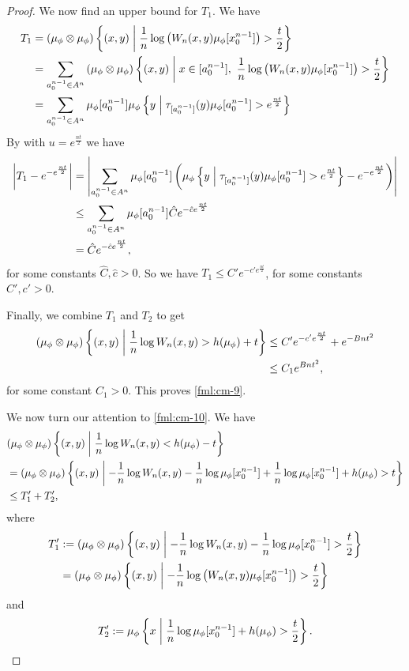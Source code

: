 \begin{theorem}
\begin{proof}
		We now find an upper bound for $T_1$. We have
		\begin{align*}
			T_1 &= (\mu_\phi \otimes \mu_\phi)\left\{(x, y) \midmid \frac{1}{n}\log\left(W_n(x, y) \mu_\phi[x_0^{n - 1}]\right) > \frac{t}{2}\right\} \\
				&= \sum_{a_0^{n - 1} \in A^n}{(\mu_\phi \otimes \mu_\phi)\left\{(x, y) \midmid x \in [a_0^{n - 1}],\ \frac{1}{n}\log\left(W_n(x, y) \mu_\phi[x_0^{n - 1}]\right) > \frac{t}{2}\right\}} \\
				&= \sum_{a_0^{n - 1} \in A^n}{\mu_\phi[a_0^{n - 1}] \mu_\phi\left\{y \midmid \tau_{[a_0^{n - 1}]}(y) \mu_\phi[a_0^{n - 1}] > e^\frac{nt}{2}\right\}}
		\end{align*}
		By  with $u = e^\frac{nt}{2}$ we have
		\begin{align*}
			\left|T_1 - e^{-e^\frac{nt}{2}}\right| &= \left|\sum_{a_0^{n - 1} \in A^n}\mu_\phi[a_0^{n - 1}]\left(\mu_\phi\left\{y \mathrel{}\middle|\mathrel{} \tau_{[a_0^{n - 1}]}(y) \mu_\phi[a_0^{n - 1}] > e^\frac{nt}{2}\right\} - e^{-e^\frac{nt}{2}}\right)\right| \\
				& \leq \sum_{a_0^{n - 1} \in A^n}\mu_\phi[a_0^{n - 1}] \hat{C}e^{-\hat{c}e^\frac{nt}{2}} \\
				& = \hat{C}e^{-\hat{c}e^\frac{nt}{2}},
		\end{align*}
		for some constants $\hat{C}, \hat{c} > 0$. So we have $T_1 \leq C'e^{-c'e^\frac{nt}{2}}$, for some constants $C', c' > 0$.
		
		Finally, we combine $T_1$ and $T_2$ to get
		\begin{align*}
			(\mu_\phi \otimes \mu_\phi)\left\{(x, y) \mathrel{}\middle|\mathrel{} \frac{1}{n}\log{W_n(x, y)} > h(\mu_\phi) + t\right\} &\leq C'e^{-c'e^\frac{nt}{2}} + e^{-Bnt^2} \\
				& \leq C_1 e^{Bnt^2},
		\end{align*}
		for some constant $C_1 > 0$. This proves \eqref{fml:cm-9}.
		
		We now turn our attention to \eqref{fml:cm-10}. We have
		\begin{align*}
			&(\mu_\phi \otimes \mu_\phi)\left\{(x, y) \mathrel{}\middle|\mathrel{} \frac{1}{n}\log{W_n(x, y)} < h(\mu_\phi) - t\right\} \\
				&= (\mu_\phi \otimes \mu_\phi)\left\{(x, y) \mathrel{}\middle|\mathrel{} -\frac{1}{n}\log{W_n(x, y)} - \frac{1}{n}\log{\mu_\phi[x_0^{n - 1}]} + \frac{1}{n}\log{\mu_\phi[x_0^{n - 1}]} + h(\mu_\phi) > t\right\} \\
				&\leq T'_1 + T'_2,
		\end{align*}
		where
		\begin{align*}
			T'_1 &:= (\mu_\phi \otimes \mu_\phi)\left\{(x, y) \mathrel{}\middle|\mathrel{} -\frac{1}{n}\log{W_n(x, y)} - \frac{1}{n}\log{\mu_\phi[x_0^{n - 1}]} > \frac{t}{2}\right\} \\
				&= (\mu_\phi \otimes \mu_\phi)\left\{(x, y) \mathrel{}\middle|\mathrel{} -\frac{1}{n}\log\left(W_n(x, y) \mu_\phi[x_0^{n - 1}]\right) > \frac{t}{2}\right\}
		\end{align*}
		and
		\[
			T'_2 := \mu_\phi \left\{x \mathrel{}\middle|\mathrel{} \frac{1}{n}\log{\mu_\phi[x_0^{n - 1}]} + h(\mu_\phi) > \frac{t}{2}\right\}.
		\]
		

\end{proof}
\end{theorem}
